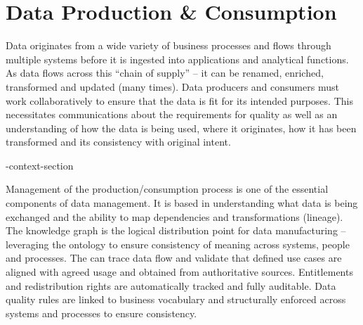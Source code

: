 \section{Data Production \& Consumption}\label{sec:ekgmm-b-4-3} %

Data originates from a wide variety of business processes and flows through multiple systems before it is
ingested into applications and analytical functions.
As data flows across this “chain of supply” -- it can be renamed, enriched, transformed and updated (many times).
Data producers and consumers must work collaboratively to ensure that the data is fit for its intended purposes.
This necessitates communications about the requirements for quality as well as an understanding of
how the data is being used, where it originates, how it has been transformed and its consistency with original intent.

\ekgmm-context-section

Management of the production/consumption process is one of the essential components of data management.
It is based in understanding what data is being exchanged and the ability to map dependencies and
transformations (lineage).
The knowledge graph is the logical distribution point for data manufacturing -- leveraging the ontology to ensure
consistency of meaning across systems, people and processes.
The  can trace data flow and validate that defined use cases are aligned with agreed usage and
obtained from authoritative sources.
Entitlements and redistribution rights are automatically tracked and fully auditable.
Data quality rules are linked to business vocabulary and structurally enforced across systems and processes
to ensure consistency.

\kgmmcorequestionssection


